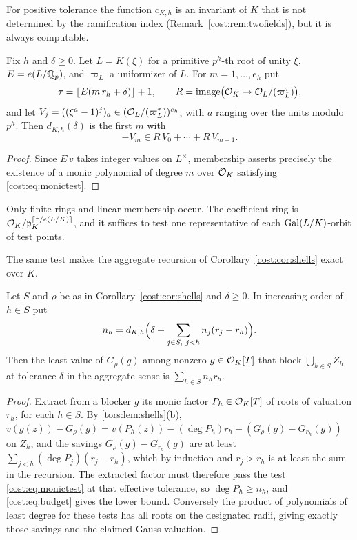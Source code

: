 For positive tolerance the function $c_{K,h}$ is an invariant of $K$ that is not determined
by the ramification index (Remark~\ref{cost:rem:twofields}), but it is always computable.

\begin{proposition}\label{cost:prop:mod}
Fix $h$ and $\delta\ge0$. Let $L=K(\xi)$ for a primitive $p^h$-th root of unity $\xi$,
$E=e(L/\mathbb{Q}_p)$, and $\varpi_L$ a uniformizer of $L$. For $m=1,\ldots,e_h$ put
\[
 \tau=\lfloor E(m\,r_h+\delta)\rfloor+1,\qquad
 R=\operatorname{image}\bigl(\mathcal{O}_K\to\mathcal{O}_L/(\varpi_L^{\tau})\bigr),
\]
and let $V_j=((\xi^a-1)^j)_a\in(\mathcal{O}_L/(\varpi_L^{\tau}))^{e_h}$, with $a$ ranging over the
units modulo $p^h$. Then $d_{K,h}(\delta)$ is the first $m$ with
\[
 -V_m\in R\,V_0+\cdots+R\,V_{m-1}.
\]
\end{proposition}

\begin{proof}
Since $E\,v$ takes integer values on $L^\times$, membership asserts precisely the existence
of a monic polynomial of degree $m$ over $\mathcal{O}_K$ satisfying \eqref{cost:eq:monictest}.
\end{proof}

Only finite rings and linear membership occur. The coefficient ring is
$\mathcal{O}_K/\mathfrak p_K^{\lceil\tau/e(L/K)\rceil}$, and it suffices to test one representative of each
$\operatorname{Gal}(L/K)$-orbit of test points.

The same test makes the aggregate recursion of Corollary~\ref{cost:cor:shells} exact over $K$.

\begin{proposition}\label{cost:prop:single}
Let $S$ and $\rho$ be as in Corollary~\ref{cost:cor:shells} and $\delta\ge0$. In increasing order of
$h\in S$ put
\[
 n_h=d_{K,h}\Bigl(\delta+\sum_{j\in S,\ j<h}n_j(r_j-r_h)\Bigr).
\]
Then the least value of $G_\rho(g)$ among nonzero $g\in\mathcal{O}_K[T]$ that block
$\bigcup_{h\in S}Z_h$ at tolerance $\delta$ in the aggregate sense is $\sum_{h\in S}n_hr_h$.
\end{proposition}

\begin{proof}
Extract from a blocker $g$ its monic factor $P_h\in\mathcal{O}_K[T]$ of roots of valuation $r_h$,
for each $h\in S$. By \cref{tors:lem:shells}(b),
$v(g(z))-G_\rho(g)=v(P_h(z))-(\deg P_h)r_h-(G_\rho(g)-G_{r_h}(g))$ on $Z_h$, and the savings
$G_\rho(g)-G_{r_h}(g)$ are at least $\sum_{j<h}(\deg P_j)(r_j-r_h)$, which by induction and
$r_j>r_h$ is at least the sum in the recursion. The extracted factor must therefore pass
the test \eqref{cost:eq:monictest} at that effective tolerance, so $\deg P_h\ge n_h$, and
\eqref{cost:eq:budget} gives the lower bound. Conversely the product of polynomials of
least degree for these tests has all roots on the designated radii, giving exactly those
savings and the claimed Gauss valuation.
\end{proof}


